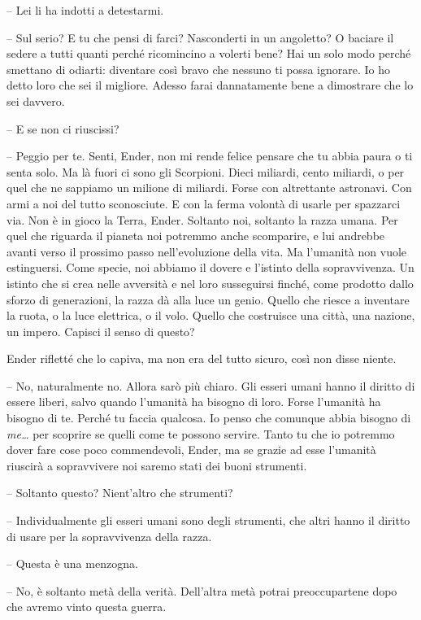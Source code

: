 {-- Lei li ha indotti a detestarmi.}

{-- Sul serio? E tu che pensi di farci? Nasconderti in un angoletto? O
	baciare il sedere a tutti quanti perché ricomincino a volerti bene? Hai
	un solo modo perché smettano di odiarti: diventare così bravo che
	nessuno ti possa ignorare. Io ho detto loro che sei il migliore. Adesso
	farai dannatamente bene a dimostrare che lo sei davvero.}

{-- E se non ci riuscissi?}

{-- Peggio per te. Senti, Ender, non mi rende felice pensare che tu
	abbia paura o ti senta solo. Ma là fuori ci sono gli Scorpioni. Dieci
	miliardi, cento miliardi, o per quel che ne sappiamo un milione di
	miliardi. Forse con altrettante astronavi. Con armi a noi del tutto
	sconosciute. E con la ferma volontà di usarle per spazzarci via. Non è
	in gioco la Terra, Ender. Soltanto noi, soltanto la razza umana. Per
	quel che riguarda il pianeta noi potremmo anche scomparire, e lui
	andrebbe avanti verso il prossimo passo nell'evoluzione della vita. Ma
	l'umanità non vuole estinguersi. Come specie, noi abbiamo il dovere e
	l'istinto della sopravvivenza. Un istinto che si crea nelle avversità e
	nel loro susseguirsi finché, come prodotto dallo sforzo di generazioni,
	la razza dà alla luce un genio. Quello che riesce a inventare la ruota,
	o la luce elettrica, o il volo. Quello che costruisce una città, una
	nazione, un impero. Capisci il senso di questo?}

{Ender rifletté che lo capiva, ma non era del tutto sicuro, così non
	disse niente.}

{-- No, naturalmente no. Allora sarò più chiaro. Gli esseri umani hanno
	il diritto di essere liberi, salvo quando l'umanità ha bisogno di loro.
	Forse l'umanità ha bisogno di te. Perché tu faccia qualcosa. Io penso
	che comunque abbia bisogno di \emph{me\ldots{}} per scoprire se quelli
	come te possono servire. Tanto tu che io potremmo dover fare cose poco
	commendevoli, Ender, ma se grazie ad esse l'umanità riuscirà a
	sopravvivere noi saremo stati dei buoni strumenti.}

{-- Soltanto questo? Nient'altro che strumenti?}

{-- Individualmente gli esseri umani sono degli strumenti, che altri
	hanno il diritto di usare per la sopravvivenza della razza.}

{-- Questa è una menzogna.}

{-- No, è soltanto metà della verità. Dell'altra metà potrai
	preoccupartene dopo che avremo vinto questa guerra.}

